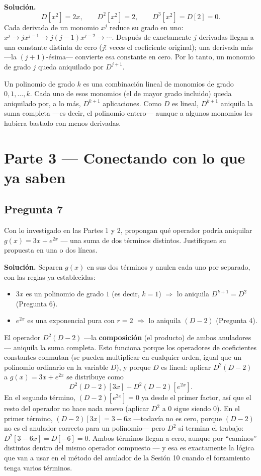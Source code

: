 \documentclass[11pt]{article}
\begin{document}
\noindent\textbf{Solución.}
\[
D[x^2]=2x, \qquad D^2[x^2]=2, \qquad D^3[x^2] = D[2] = 0.
\]
Cada derivada de un monomio $x^j$ reduce su grado en uno: $x^j \to jx^{j-1} \to j(j-1)x^{j-2} \to \cdots$. Después de exactamente $j$ derivadas llegan a una constante distinta de cero ($j!$ veces el coeficiente original); una derivada más —la $(j+1)$-ésima— convierte esa constante en cero. Por lo tanto, un monomio de grado $j$ queda aniquilado por $D^{j+1}$.

Un polinomio de grado $k$ es una combinación lineal de monomios de grado $0,1,\dots,k$. Cada uno de esos monomios (el de mayor grado incluido) queda aniquilado por, a lo más, $D^{k+1}$ aplicaciones. Como $D$ es lineal, $D^{k+1}$ aniquila la suma completa —es decir, el polinomio entero— aunque a algunos monomios les hubiera bastado con menos derivadas.

\section*{Parte 3 — Conectando con lo que ya saben}

\subsection*{Pregunta 7}
\begin{pregunta}
Con lo investigado en las Partes 1 y 2, propongan qué operador podría aniquilar $g(x) = 3x + e^{2x}$ — una suma de dos términos distintos. Justifiquen su propuesta en una o dos líneas.
\end{pregunta}

\noindent\textbf{Solución.} Separen $g(x)$ en sus dos términos y anulen cada uno por separado, con las reglas ya establecidas:
\begin{itemize}
  \item $3x$ es un polinomio de grado $1$ (es decir, $k=1$) $\Rightarrow$ lo aniquila $D^{k+1}=D^2$ (Pregunta 6).
  \item $e^{2x}$ es una exponencial pura con $r=2$ $\Rightarrow$ lo aniquila $(D-2)$ (Pregunta 4).
\end{itemize}
El operador $D^2(D-2)$ —la \textbf{composición} (el producto) de ambos anuladores— aniquila la suma completa. Esto funciona porque los operadores de coeficientes constantes conmutan (se pueden multiplicar en cualquier orden, igual que un polinomio ordinario en la variable $D$), y porque $D$ es lineal: aplicar $D^2(D-2)$ a $g(x)=3x+e^{2x}$ se distribuye como
\[
D^2(D-2)[3x] + D^2(D-2)[e^{2x}].
\]
En el segundo término, $(D-2)[e^{2x}]=0$ ya desde el primer factor, así que el resto del operador no hace nada nuevo (aplicar $D^2$ a $0$ sigue siendo $0$). En el primer término, $(D-2)[3x]=3-6x$ —todavía no es cero, porque $(D-2)$ no es el anulador correcto para un polinomio— pero $D^2$ sí termina el trabajo: $D^2[3-6x]=D[-6]=0$. Ambos términos llegan a cero, aunque por ``caminos'' distintos dentro del mismo operador compuesto — y esa es exactamente la lógica que van a usar en el método del anulador de la Sesión 10 cuando el forzamiento tenga varios términos.
\end{document}
